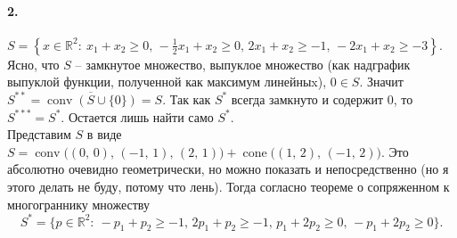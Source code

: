 \documentclass{article}
\DeclareMathOperator{\conv}{conv}
\DeclareMathOperator{\cone}{cone}
\newcommand*{\R}{\mathbb{R}}
\begin{document}
\paragraph{2.} $ S = \left\{ x \in \R^2 :\: x_1 + x_2 \geqslant 0,\, -\frac12 x_1 + x_2 \geqslant 0,\, 2x_1 + x_2 \geqslant - 1,\, -2x_1 + x_2 \geqslant -3 \right\}. $ \\
Ясно, что $S$ -- замкнутое множество, выпуклое множество (как надграфик выпуклой функции, полученной как максимум линейныx), $0 \in S$. Значит $S^{\ast\ast} = \overline{\conv(S \cup \{0\})} = S$. Так как $S^\ast$ всегда замкнуто и содержит 0, то $S^{\ast\ast\ast} = S^\ast$. Остается лишь найти само $S^\ast$. \\
Представим $S$ в виде $S = \conv\!\big((0,\, 0),\, (-1,\, 1),\, (2,\, 1)\big) + \cone\!\big( (1,\, 2),\, (-1,\, 2) \big)$. Это абсолютно очевидно геометрически, но можно показать и непосредственно (но я этого делать не буду, потому что лень).
Тогда согласно теореме о сопряженном к многограннику множеству 
\[ S^\ast = \{ p \in \R^2 :\: -p_1 + p_2 \geqslant - 1,\, 2 p_1 + p_2 \geqslant - 1,\, p_1 + 2 p_2 \geqslant 0,\, -p_1 + 2 p_2 \geqslant 0 \}. \]
\end{document}
